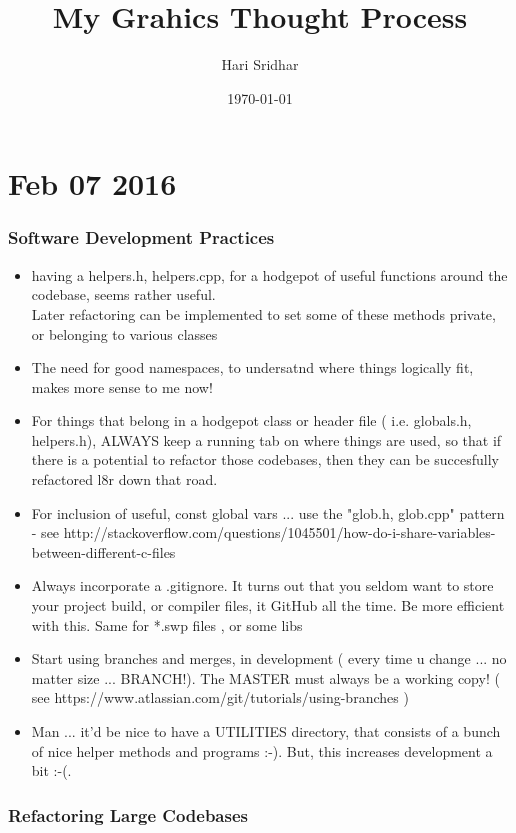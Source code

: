 \documentclass{article}
\begin{document}
\title*{My Grahics Thought Process}
\author{Hari Sridhar}
\date{\today}
\newpage

\part{Feb 07 2016}
\section{Software Development Practices}
\begin{itemize}
	\item having a helpers.h, helpers.cpp, for a hodgepot of useful functions around the codebase, seems rather useful. 
	\\ Later refactoring can be implemented to set some of these methods private, or belonging to various classes
	\item The need for good namespaces, to undersatnd where things logically fit, makes more sense to me now!
	\item For things that belong in a hodgepot class or header file ( i.e. globals.h, helpers.h), ALWAYS keep a running tab on where things are used, so that if there is a potential to refactor those codebases, then they can be succesfully refactored l8r down that road.
	\item For inclusion of useful, const global vars ... use the "glob.h, glob.cpp" pattern - see http://stackoverflow.com/questions/1045501/how-do-i-share-variables-between-different-c-files
	\item Always incorporate a .gitignore. It turns out that you seldom want to store your project build, or compiler files, it GitHub all the time. Be more efficient with this. Same for *.swp files , or some libs
	\item Start using branches and merges, in development ( every time u change ... no matter size ... BRANCH!). The MASTER must always be a working copy!  ( see https://www.atlassian.com/git/tutorials/using-branches ) 
	\item Man ... it'd be nice to have a UTILITIES directory, that consists of a bunch of nice helper methods and programs :-). But, this increases development a bit :-(.
\end{itemize}

\section{Refactoring Large Codebases}
\end{document}
